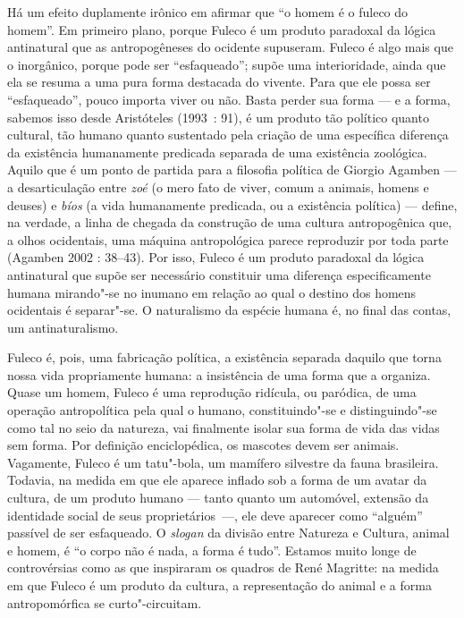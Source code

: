 Há um efeito duplamente irônico em afirmar que ``o homem é o fuleco do
homem''. Em primeiro plano, porque Fuleco é um produto paradoxal da
lógica antinatural que as antropogêneses do ocidente supuseram. Fuleco é
algo mais que o inorgânico, porque pode ser ``esfaqueado''; supõe uma
interioridade, ainda que ela se resuma a uma pura forma destacada do
vivente. Para que ele possa ser ``esfaqueado'', pouco importa viver ou
não. Basta perder sua forma --- e a forma, sabemos isso desde Aristóteles
(1993~: 91), é um produto tão político quanto cultural, tão humano
quanto sustentado pela criação de uma específica diferença da existência
humanamente predicada separada de uma existência zoológica. Aquilo que é
um ponto de partida para a filosofia política de Giorgio Agamben --- a
desarticulação entre \emph{zoé }(o mero fato de viver, comum a animais,
homens e deuses) e \emph{bíos} (a vida humanamente predicada, ou a
existência política) --- define, na verdade, a linha de chegada da
construção de uma cultura antropogênica que, a olhos ocidentais, uma
máquina antropológica parece reproduzir por toda parte (Agamben 2002 :
38--43). Por isso, Fuleco é um produto paradoxal da lógica antinatural
que supõe ser necessário constituir uma diferença especificamente humana
mirando"-se no inumano em relação ao qual o destino dos homens ocidentais
é separar"-se. O naturalismo da espécie humana é, no final das contas, um
antinaturalismo.

Fuleco é, pois, uma fabricação política, a existência separada daquilo
que torna nossa vida propriamente humana: a insistência de uma forma que
a organiza. Quase um homem, Fuleco é uma reprodução ridícula, ou
paródica, de uma operação antropolítica pela qual o humano,
constituindo"-se e distinguindo"-se como tal no seio da natureza, vai
finalmente isolar sua forma de vida das vidas sem forma. Por definição
enciclopédica, os mascotes devem ser animais. Vagamente, Fuleco é um
tatu"-bola, um mamífero silvestre da fauna brasileira. Todavia, na medida
em que ele aparece inflado sob a forma de um avatar da cultura, de um
produto humano --- tanto quanto um automóvel, extensão da identidade
social de seus proprietários~---, ele deve aparecer como ``alguém''
passível de ser esfaqueado. O \emph{slogan} da divisão entre Natureza e
Cultura, animal e homem, é ``o corpo não é nada, a forma é tudo''.
Estamos muito longe de controvérsias como as que inspiraram os quadros
de René Magritte: na medida em que Fuleco é um produto da
cultura, a representação do animal e a forma antropomórfica se
curto"-circuitam.

